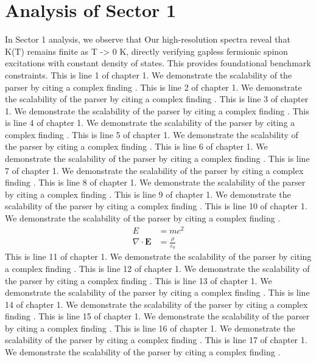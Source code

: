 \chapter{Analysis of Sector 1}

In Sector 1 analysis, we observe that Our high-resolution spectra reveal that K(T) remains finite as T -> 0 K, directly verifying gapless fermionic spinon excitations with constant density of states. This provides foundational benchmark constraints.
This is line 1 of chapter 1. We demonstrate the scalability of the parser by citing a complex finding \cite{ref1_1}.
This is line 2 of chapter 1. We demonstrate the scalability of the parser by citing a complex finding \cite{ref1_2}.
This is line 3 of chapter 1. We demonstrate the scalability of the parser by citing a complex finding \cite{ref1_3}.
This is line 4 of chapter 1. We demonstrate the scalability of the parser by citing a complex finding \cite{ref1_4}.
This is line 5 of chapter 1. We demonstrate the scalability of the parser by citing a complex finding \cite{ref1_5}.
This is line 6 of chapter 1. We demonstrate the scalability of the parser by citing a complex finding \cite{ref1_6}.
This is line 7 of chapter 1. We demonstrate the scalability of the parser by citing a complex finding \cite{ref1_7}.
This is line 8 of chapter 1. We demonstrate the scalability of the parser by citing a complex finding \cite{ref1_8}.
This is line 9 of chapter 1. We demonstrate the scalability of the parser by citing a complex finding \cite{ref1_9}.
This is line 10 of chapter 1. We demonstrate the scalability of the parser by citing a complex finding \cite{ref1_10}.
\begin{align*}
  E &= mc^2 \\
  \nabla \cdot \mathbf{E} &= \frac{\rho}{\varepsilon_0}
\end{align*}
This is line 11 of chapter 1. We demonstrate the scalability of the parser by citing a complex finding \cite{ref1_11}.
This is line 12 of chapter 1. We demonstrate the scalability of the parser by citing a complex finding \cite{ref1_12}.
This is line 13 of chapter 1. We demonstrate the scalability of the parser by citing a complex finding \cite{ref1_13}.
This is line 14 of chapter 1. We demonstrate the scalability of the parser by citing a complex finding \cite{ref1_14}.
This is line 15 of chapter 1. We demonstrate the scalability of the parser by citing a complex finding \cite{ref1_15}.
This is line 16 of chapter 1. We demonstrate the scalability of the parser by citing a complex finding \cite{ref1_16}.
This is line 17 of chapter 1. We demonstrate the scalability of the parser by citing a complex finding \cite{ref1_17}.
